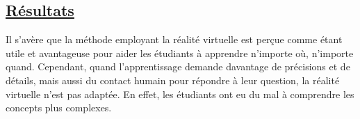 \documentclass[a4paper,10pt, oneside]{article}
\begin{document}
\subsection{\ul{Résultats}}
        \par Il s'avère que la méthode employant la réalité virtuelle est perçue comme étant utile et avantageuse pour aider les étudiants à apprendre n'importe où, n'importe quand. Cependant,
        quand l'apprentissage demande davantage de précisions et de détails, mais aussi du contact humain pour répondre à leur question, la réalité virtuelle n'est pas adaptée. En effet, les étudiants ont eu du mal à comprendre les concepts plus complexes.
\newpage



\end{document}
